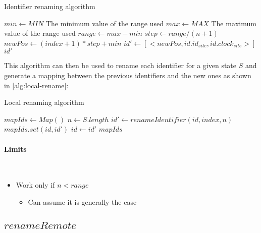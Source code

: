 \documentclass[a4paper]{article}
\begin{document}
\begin{algorithm}
  \caption{Identifier renaming algorithm}
  \label{alg:id-rename}
  \begin{algorithmic}
      \State $min \gets MIN$
      \Comment The minimum value of the range used
      \State $max \gets MAX$
      \Comment The maximum value of the range used
      \State $range \gets max - min$
      \State $step \gets range / (n + 1)$
      \State $newPos \gets (index + 1) * step + min$
      \State $id' \gets [<newPos, id.id_{site}, id.clock_{site}>]$
      \State \Return $id'$
    \EndFunction
  \end{algorithmic}
\end{algorithm}

This algorithm can then be used to rename each identifier
for a given state $S$ and generate a mapping between the previous identifiers
and the new ones as shown in \ref{alg:local-rename}:

\begin{algorithm}
  \caption{Local renaming algorithm}
  \label{alg:local-rename}
  \begin{algorithmic}
      \State $mapIds \gets Map()$
      \State $n \gets S.length$
        \State $id' \gets renameIdentifier(id, index, n)$
        \State $mapIds.set(id, id')$
        \State $id \gets id'$
      \EndFor
      \State \Return $mapIds$
    \EndFunction
  \end{algorithmic}
\end{algorithm}

\paragraph{Limits}~\\

\begin{itemize}
  \item Work only if $n < range$
  \begin{itemize}
    \item Can assume it is generally the case
  \end{itemize}
\end{itemize}

\subsection{$renameRemote$}
\end{document}

